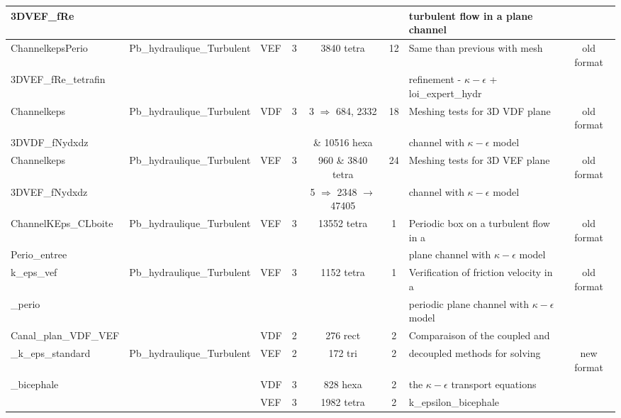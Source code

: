 \begin{table}[H]
\begin{centering}
\begin{tabular}{lclccclc}
\rowcolor{SkyBlue!10}3DVEF\_fRe & & & & & & turbulent flow  in a plane channel & \\ \hline
\rowcolor{SkyBlue!10}ChannelkepsPerio & Pb\_hydraulique\_Turbulent & VEF & 3 & 3840 tetra & 12 & Same than previous with mesh & old format \\ 
\rowcolor{SkyBlue!10}3DVEF\_fRe\_tetrafin & & & & & & refinement - $\kappa-\epsilon$ + loi\_expert\_hydr & \\ \hline
\rowcolor{SkyBlue!10}Channelkeps & Pb\_hydraulique\_Turbulent & VDF & 3 & 3 $\Rightarrow$ 684, 2332 & 18 & Meshing tests for 3D VDF plane & old format \\ 
\rowcolor{SkyBlue!10}3DVDF\_fNydxdz & & & & \& 10516 hexa & & channel with $\kappa-\epsilon$ model &  \\ \hline
\rowcolor{SkyBlue!10}Channelkeps & Pb\_hydraulique\_Turbulent & VEF & 3 & 960 \& 3840 tetra & 24 & Meshing tests for 3D VEF plane & old format \\ 
\rowcolor{SkyBlue!10}3DVEF\_fNydxdz & & & & 5 $\Rightarrow$ 2348 $\to$ 47405 & & channel with $\kappa-\epsilon$ model & \\ \hline
\rowcolor{SkyBlue!10}ChannelKEps\_CLboite & Pb\_hydraulique\_Turbulent & VEF & 3 & 13552 tetra & 1 & Periodic box on a turbulent flow in a & old format \\ 
\rowcolor{SkyBlue!10}Perio\_entree & & & & & & plane channel with $\kappa-\epsilon$ model & \\ \hline
\rowcolor{SkyBlue!10}k\_eps\_vef & Pb\_hydraulique\_Turbulent & VEF & 3 & 1152 tetra & 1 & Verification of friction velocity in a  & old format \\ 
\rowcolor{SkyBlue!10}\_perio & & & & & & periodic plane channel with $\kappa-\epsilon$ model & \\ \hline
\rowcolor{SkyBlue!10}Canal\_plan\_VDF\_VEF & & VDF & 2 & 276 rect & 2 & Comparaison of the coupled and  & \\ 
\rowcolor{SkyBlue!10}\_k\_eps\_standard & Pb\_hydraulique\_Turbulent & VEF & 2 & 172 tri & 2 & decoupled methods for solving  & new format \\
\rowcolor{SkyBlue!10}\_bicephale & & VDF & 3 & 828 hexa & 2 & the $\kappa-\epsilon$ transport equations & \\ 
\rowcolor{SkyBlue!10} & & VEF & 3 & 1982 tetra & 2 & k\_epsilon\_bicephale & \\ 
\hline

	\end{tabular}
\end{centering}
\end{table}

